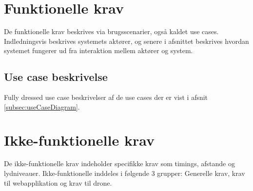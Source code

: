 \section{Funktionelle krav}
\label{sec:funkKrav}
De funktionelle krav beskrives via brugsscenarier, også kaldet use cases. Indledningsvis beskrives systemets aktører, og senere i afsnittet beskrives hvordan systemet fungerer ud fra interaktion mellem aktører og system.

			



\newpage
\subsection{Use case beskrivelse}
\label{subsec:useCaseBeskrivelse}
Fully dressed use case beskrivelser af de use cases der er vist i afsnit \ref{subsec:useCaseDiagram}. \newline 








\newpage
\section{Ikke-funktionelle krav}
\label{sec:ikkeFunkKrav}
De ikke-funktionelle krav indeholder specifikke krav som timings, afstande og lydniveauer.
Ikke-funktionelle inddeles i følgende 3 grupper: Generelle krav, krav til webapplikation og krav til drone.\newline


